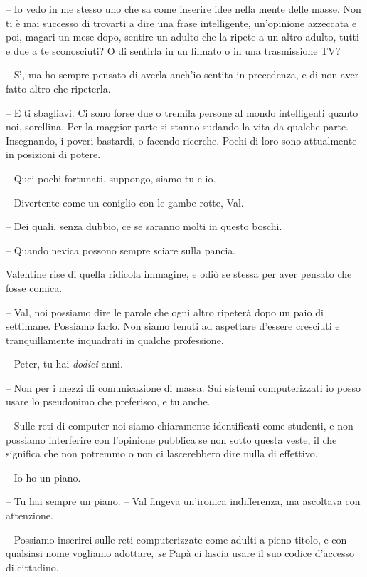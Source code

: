 {-- Io vedo in me stesso uno che sa come inserire idee nella mente delle
	masse. Non ti è mai successo di trovarti a dire una frase intelligente,
	un'opinione azzeccata e poi, magari un mese dopo, sentire un adulto che
	la ripete a un altro adulto, tutti e due a te sconosciuti? O di sentirla
	in un filmato o in una trasmissione TV?}

{-- Sì, ma ho sempre pensato di averla anch'io sentita in precedenza, e
	di non aver fatto altro che ripeterla.}

{-- E ti sbagliavi. Ci sono forse due o tremila persone al mondo
	intelligenti quanto noi, sorellina. Per la maggior parte si stanno
	sudando la vita da qualche parte. Insegnando, i poveri bastardi, o
	facendo ricerche. Pochi di loro sono attualmente in posizioni di
	potere.}

{-- Quei pochi fortunati, suppongo, siamo tu e io.}

{-- Divertente come un coniglio con le gambe rotte, Val.}

{-- Dei quali, senza dubbio, ce se saranno molti in questo boschi.}

{-- Quando nevica possono sempre sciare sulla pancia.}

{Valentine rise di quella ridicola immagine, e odiò se stessa per aver
	pensato che fosse comica.}

{-- Val, noi possiamo dire le parole che ogni altro ripeterà dopo un
	paio di settimane. Possiamo farlo. Non siamo tenuti ad aspettare
	d'essere cresciuti e tranquillamente inquadrati in qualche professione.}

{-- Peter, tu hai \emph{dodici} anni.}

{-- Non per i mezzi di comunicazione di massa. Sui sistemi
	computerizzati io posso usare lo pseudonimo che preferisco, e tu anche.}

{-- Sulle reti di computer noi siamo chiaramente identificati come
	studenti, e non possiamo interferire con l'opinione pubblica se non
	sotto questa veste, il che significa che non potremmo o non ci
	lascerebbero dire nulla di effettivo.}

{-- Io ho un piano.}

{-- Tu hai sempre un piano. -- Val fingeva un'ironica indifferenza, ma
	ascoltava con attenzione.}

{-- Possiamo inserirci sulle reti computerizzate come adulti a pieno
	titolo, e con qualsiasi nome vogliamo adottare, \emph{se} Papà ci lascia
	usare il suo codice d'accesso di cittadino.}

